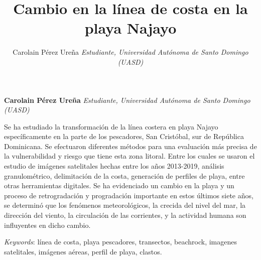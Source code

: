 \documentclass[11pt,]{article}
\title{Cambio en la línea de costa en la playa Najayo  }
\author{\Large Carolain Pérez Ureña\vspace{0.05in} \newline\normalsize\emph{Estudiante, Universidad Autónoma de Santo Domingo (UASD)}  }
\date{}
\newcommand*{\authorfont}{\fontfamily{phv}\selectfont}
\renewenvironment{abstract}
 {{%
    \setlength{\leftmargin}{0mm}
    \setlength{\rightmargin}{\leftmargin}%
  }%
  \relax}
 {\endlist}
\begin{document}
	
%

{%
\setlength{\parindent}{0pt}
\thispagestyle{plain}
{\fontsize{18}{20}\selectfont\raggedright 
\maketitle  %

}

{
   \vskip 13.5pt\relax \normalsize\fontsize{11}{12} 
\textbf{\authorfont Carolain Pérez Ureña} \hskip 15pt \emph{\small Estudiante, Universidad Autónoma de Santo Domingo (UASD)}   

}

}








\begin{abstract}

    \hbox{\vrule height .2pt width 39.14pc}

    \vskip 8.5pt %

\noindent Se ha estudiado la transformación de la línea costera en playa Najayo
específicamente en la parte de los pescadores, San Cristóbal, sur de
República Dominicana. Se efectuaron diferentes métodos para una
evaluación más precisa de la vulnerabilidad y riesgo que tiene esta zona
litoral. Entre los cuales se usaron el estudio de imágenes satelitales
hechas entre los años 2013-2019, análisis granulométrico, delimitación
de la costa, generación de perfiles de playa, entre otras herramientas
digitales. Se ha evidenciado un cambio en la playa y un proceso de
retrogradación y progradación importante en estos últimos siete años, se
determinó que los fenómenos meteorológicos, la crecida del nivel del
mar, la dirección del viento, la circulación de las corrientes, y la
actividad humana son influyentes en dicho cambio.


\vskip 8.5pt \noindent \emph{Keywords}: línea de costa, playa pescadores, transectos, beachrock, imagenes
satelitales, imágenes aéreas, perfil de playa, clastos. \par

    \hbox{\vrule height .2pt width 39.14pc}



\end{abstract}
\end{document}

